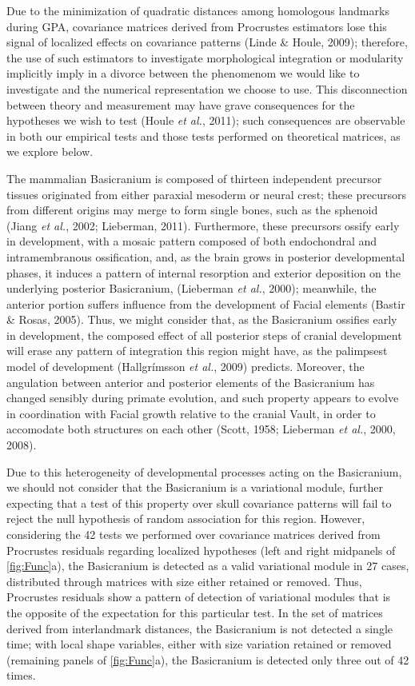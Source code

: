 \documentclass[12pt,]{article}
\begin{document}
Due to the minimization of quadratic distances among homologous
landmarks during GPA, covariance matrices derived from Procrustes
estimators lose this signal of localized effects on covariance patterns
(Linde \& Houle, 2009); therefore, the use of such estimators to
investigate morphological integration or modularity implicitly imply in
a divorce between the phenomenom we would like to investigate and the
numerical representation we choose to use. This disconnection between
theory and measurement may have grave consequences for the hypotheses we
wish to test (Houle \emph{et al.}, 2011); such consequences are
observable in both our empirical tests and those tests performed on
theoretical matrices, as we explore below.

The mammalian Basicranium is composed of thirteen independent precursor
tissues originated from either paraxial mesoderm or neural crest; these
precursors from different origins may merge to form single bones, such
as the sphenoid (Jiang \emph{et al.}, 2002; Lieberman, 2011).
Furthermore, these precursors ossify early in development, with a mosaic
pattern composed of both endochondral and intramembranous ossification,
and, as the brain grows in posterior developmental phases, it induces a
pattern of internal resorption and exterior deposition on the underlying
posterior Basicranium, (Lieberman \emph{et al.}, 2000); meanwhile, the
anterior portion suffers influence from the development of Facial
elements (Bastir \& Rosas, 2005). Thus, we might consider that, as the
Basicranium ossifies early in development, the composed effect of all
posterior steps of cranial development will erase any pattern of
integration this region might have, as the palimpsest model of
development (Hallgrímsson \emph{et al.}, 2009) predicts. Moreover, the
angulation between anterior and posterior elements of the Basicranium
has changed sensibly during primate evolution, and such property appears
to evolve in coordination with Facial growth relative to the cranial
Vault, in order to accomodate both structures on each other (Scott,
1958; Lieberman \emph{et al.}, 2000, 2008).

Due to this heterogeneity of developmental processes acting on the
Basicranium, we should not consider that the Basicranium is a
variational module, further expecting that a test of this property over
skull covariance patterns will fail to reject the null hypothesis of
random association for this region. However, considering the 42 tests we
performed over covariance matrices derived from Procrustes residuals
regarding localized hypotheses (left and right midpanels of
\autoref{fig:Func}a), the Basicranium is detected as a valid variational
module in 27 cases, distributed through matrices with size either
retained or removed. Thus, Procrustes residuals show a pattern of
detection of variational modules that is the opposite of the expectation
for this particular test. In the set of matrices derived from
interlandmark distances, the Basicranium is not detected a single time;
with local shape variables, either with size variation retained or
removed (remaining panels of \autoref{fig:Func}a), the Basicranium is
detected only three out of 42 times.
\end{document}
